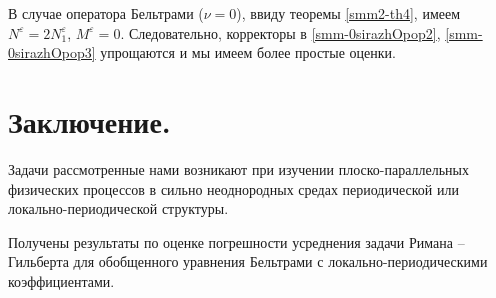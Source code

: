 В случае оператора Бельтрами ($\nu=0$), ввиду теоремы \ref{smm2-th4}, имеем
$N^\varepsilon=2N_1^\varepsilon$, $M^\varepsilon=0$. Следовательно, корректоры в \eqref{smm-0sirazhOpop2}, \eqref{smm-0sirazhOpop3} упрощаются
и мы имеем более простые оценки.



 \section{Заключение.}

 Задачи рассмотренные нами возникают при изучении плоско-парал\-лельных физических процессов в сильно неоднородных
 средах периодической или локально-периодической структуры.

 Получены результаты по оценке погрешности усреднения задачи Римана -- Гильберта для обобщенного уравнения Бельтрами
 с локально-периодическими коэффициентами.



